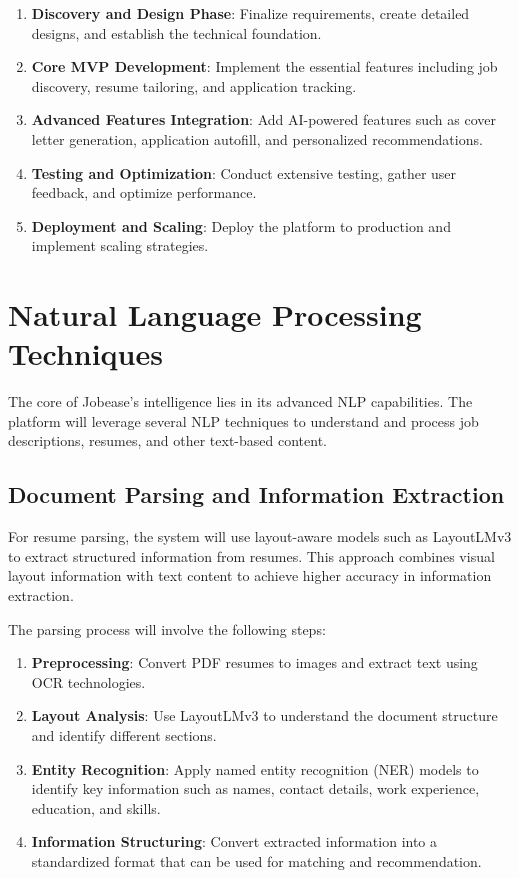 \documentclass[12pt,a4paper]{report}
\begin{document}
\begin{enumerate}
    \item \textbf{Discovery and Design Phase}: Finalize requirements, create detailed designs, and establish the technical foundation.
    \item \textbf{Core MVP Development}: Implement the essential features including job discovery, resume tailoring, and application tracking.
    \item \textbf{Advanced Features Integration}: Add AI-powered features such as cover letter generation, application autofill, and personalized recommendations.
    \item \textbf{Testing and Optimization}: Conduct extensive testing, gather user feedback, and optimize performance.
    \item \textbf{Deployment and Scaling}: Deploy the platform to production and implement scaling strategies.
\end{enumerate}

\section*{Natural Language Processing Techniques}

The core of Jobease's intelligence lies in its advanced NLP capabilities. The platform will leverage several NLP techniques to understand and process job descriptions, resumes, and other text-based content.

\subsection*{Document Parsing and Information Extraction}

For resume parsing, the system will use layout-aware models such as LayoutLMv3 \cite{layoutlmv3} to extract structured information from resumes. This approach combines visual layout information with text content to achieve higher accuracy in information extraction.

The parsing process will involve the following steps:

\begin{enumerate}
    \item \textbf{Preprocessing}: Convert PDF resumes to images and extract text using OCR technologies.
    \item \textbf{Layout Analysis}: Use LayoutLMv3 to understand the document structure and identify different sections.
    \item \textbf{Entity Recognition}: Apply named entity recognition (NER) models to identify key information such as names, contact details, work experience, education, and skills.
    \item \textbf{Information Structuring}: Convert extracted information into a standardized format that can be used for matching and recommendation.
\end{enumerate}
\end{document}
